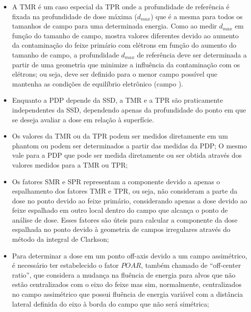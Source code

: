 \documentclass[11pt,a4paper]{article}
\begin{document}
\begin{tcolorbox}[width=\textwidth, colback={white}, title={$\bigstar$ \LobsterTwo{Pontos Chave}$\bigstar $}, coltitle={CarnationPink}, colframe={DarkTurquoise}, fonttitle=\LobsterTwo\Large]
\begin{itemize}[label=\textcolor{CarnationPink}{$\star$}]
        \item A TMR é um caso especial da TPR onde a profundidade de referência é fixada na profundidade de dose máxima ($d_{max}$) que é a mesma para todos os tamanhos de campo para uma determinada energia. Como ao medir $d_{max}$ em função do tamanho de campo, mostra valores diferentes devido ao aumento da contaminação do feixe primário com elétrons em função do aumento do tamanho de campo, a profundidade $d_{max}$ de referência deve ser determinada a partir de uma geometria que minimize a influência da contaminação com os elétrons; ou seja, deve ser definido para o menor campo possível que mantenha as condições de equilíbrio eletrônico (campo ).
        
        \item Enquanto a PDP depende da SSD, a TMR e a TPR são praticamente independentes da SSD, dependendo apenas da profundidade do ponto em que se deseja avaliar a dose em relação à superfície. 
        
        \item Os valores da TMR ou da TPR podem ser medidos diretamente em um phantom ou podem ser determinados a partir das medidas da PDP; O mesmo vale para a PDP que pode ser medida diretamente ou ser obtida através dos valores medidos para a TMR ou TPR;
        
        \item Os fatores SMR e SPR representam a componente devido a apenas o espalhamento dos fatores TMR e TPR, ou seja, não consideram a parte da dose no ponto devido ao feixe primário, considerando apenas a dose devido ao feixe espalhado em outro local dentro do campo que alcança o ponto de análise de dose. Esses fatores são úteis para calcular a componente da dose espalhada no ponto devido à geometria de campos irregulares através do método da integral de Clarkson;
        
        \item Para determinar a dose em um ponto off-axis devido a um campo assimétrico, é necessário ter estabelecido o fator $POAR$, também chamado de ``off-center ratio'', que considera a mudança na fluência de energia para alvos que não estão centralizados com o eixo do feixe mas sim, normalmente, centralizados no campo assimétrico que possui fluência de energia variável com a distância lateral definida do eixo à borda do campo que não será simétrica; 
        
    \end{itemize}
    \end{tcolorbox}


\end{document}
